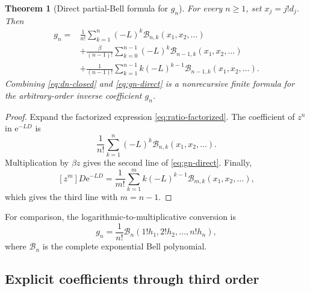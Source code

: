 \documentclass[11pt,oneside]{article}
\numberwithin{equation}{section}
\newtheorem{theorem}{Theorem}[section]
\theoremstyle{definition}
\theoremstyle{remark}
\newcommand{\e}{\mathrm e}
\newcommand{\Bell}{\mathcal B}
\begin{document}
\begin{theorem}[Direct partial-Bell formula for $g_n$]
\label{thm:direct-gn}
For every $n\ge1$, set $x_j=j!d_j$.  Then
\begin{equation}
\boxed{\begin{aligned}
 g_n={}&\frac1{n!}\sum_{k=1}^{n}(-L)^k\Bell_{n,k}(x_1,x_2,\ldots)\\
 &+\frac{\beta}{(n-1)!}\sum_{k=0}^{n-1}(-L)^k
       \Bell_{n-1,k}(x_1,x_2,\ldots)\\
 &+\frac1{(n-1)!}\sum_{k=1}^{n-1}k(-L)^{k-1}
       \Bell_{n-1,k}(x_1,x_2,\ldots).
\end{aligned}}
 \label{eq:gn-direct}
\end{equation}
Combining \eqref{eq:dn-closed} and \eqref{eq:gn-direct} is a nonrecursive
finite formula for the arbitrary-order inverse coefficient $g_n$.
\end{theorem}

\begin{proof}
Expand the factorized expression \eqref{eq:ratio-factorized}.  The coefficient
of $z^n$ in $\e^{-LD}$ is
\[
 \frac1{n!}\sum_{k=1}^n(-L)^k\Bell_{n,k}(x_1,x_2,\ldots).
\]
Multiplication by $\beta z$ gives the second line of
\eqref{eq:gn-direct}.  Finally,
\[
 [z^m]D\e^{-LD}
 =\frac1{m!}\sum_{k=1}^m k(-L)^{k-1}
   \Bell_{m,k}(x_1,x_2,\ldots),
\]
which gives the third line with $m=n-1$.
\end{proof}

For comparison, the logarithmic-to-multiplicative conversion is
\begin{equation}
 g_n=\frac1{n!}\Bell_n(1!h_1,2!h_2,\ldots,n!h_n),
 \label{eq:complete-Bell}
\end{equation}
where $\Bell_n$ is the complete exponential Bell polynomial.

\subsection{Explicit coefficients through third order}
\end{document}
